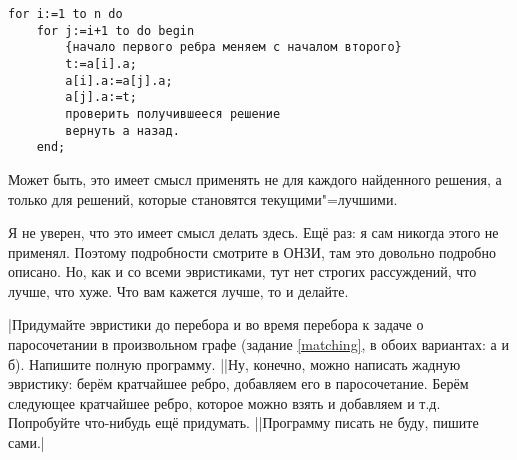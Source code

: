 \begin{codesampleo}\begin{verbatim}
for i:=1 to n do
    for j:=i+1 to do begin
        {начало первого ребра меняем с началом второго}
        t:=a[i].a; 
        a[i].a:=a[j].a;
        a[j].a:=t;
        проверить получившееся решение
        вернуть a назад.
    end;
\end{verbatim}\end{codesampleo}
Может быть, это имеет смысл применять не для каждого найденного решения, а только для решений, которые становятся текущими"=лучшими.

Я не уверен, что это имеет смысл делать здесь. Ещё раз: я сам никогда этого не применял. 
Поэтому подробности смотрите в ОНЗИ, там это довольно подробно описано. Но, как и со всеми эвристиками, тут нет строгих рассуждений, что лучше, что хуже. Что вам кажется лучше, то и делайте.


\task|Придумайте эвристики до перебора и во время перебора к задаче о паросочетании в
произвольном графе (задание \ref{matching}, в обоих вариантах: а и б). Напишите 
полную программу.
||Ну, конечно, можно написать жадную эвристику: берём кратчайшее ребро, добавляем его в 
паросочетание. Берём следующее кратчайшее ребро, которое можно взять и 
добавляем и т.д. Попробуйте что-нибудь ещё придумать.
||Программу писать не буду, пишите сами.|
